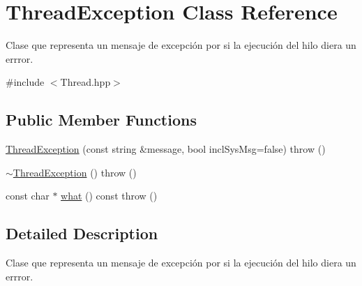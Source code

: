 \hypertarget{class_thread_exception}{\section{\-Thread\-Exception \-Class \-Reference}
\label{class_thread_exception}
}


\-Clase que representa un mensaje de excepción por si la ejecución del hilo diera un errror.  




{\ttfamily \#include $<$\-Thread.\-hpp$>$}

\subsection*{\-Public \-Member \-Functions}
\begin{DoxyCompactItemize}
\item 
\hyperlink{class_thread_exception_a3effcc3da05430c4b7700cd7cd1345e3}{\-Thread\-Exception} (const string \&message, bool incl\-Sys\-Msg=false)  throw ()
\item 
\hyperlink{class_thread_exception_a4c09e4a9676f90c25d9581f5235666d4}{$\sim$\-Thread\-Exception} ()  throw ()
\item 
const char $\ast$ \hyperlink{class_thread_exception_aaf731aac495bf3711f229e53c4fcb04b}{what} () const   throw ()
\end{DoxyCompactItemize}


\subsection{\-Detailed \-Description}
\-Clase que representa un mensaje de excepción por si la ejecución del hilo diera un errror. 

